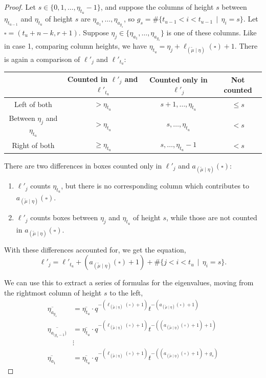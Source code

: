 \documentclass[ALCO]{cedram}
\newcommand{\mutilde}{{\widetilde{\mu}}}
\newcommand{\mutildeeta}{{(\mutilde \mid \eta)}}
\newcommand{\leg}[1]{{\ell_{#1}(\square)}}
\newcommand{\armtwo}[1]{{a_{#1}(\square)}}
\newcommand{\ltm}{\ell'_{t_u}}
\newcommand{\lj}{\ell'_j}
\begin{document}
\begin{proof}
Let $s \in \{0,1, \dotsc, \eta_{t_u}-1\}$, and suppose the columns of height $s$ between $\eta_{t_{u-1}}$ and $\eta_{t_u}$ of height $s$ are $\eta_{a_1}, \dotsc, \eta_{a_{g_s}}$, so $g_s = \# \{t_{u-1} < i < t_{u-1} \, \mid \, \eta_i = s \}$. Let $\square = (t_u+n-k,r+1)$. Suppose $\eta_j\in \{ \eta_{a_1}, \dotsc, \eta_{a_{g_s}}\}$ is one of these columns. Like in case 1, comparing column heights, we have $\eta_{t_u} = \eta_j + \leg{\mutildeeta}+1$. There is again a comparison of $\lj$ and $\ltm$: 
\begin{center}\begin{tabular}{|c|c|c|c|}
     \hline
     & Counted in $\lj$ and $\ltm$ & Counted only in $\lj$ & Not counted   \\ \hline
     Left of both& $> \eta_{t_u}$ & $s+1, \dotsc, \eta_{t_u}$ & $\leq s$ \\ \hline
     Between $\eta_j$ and $\eta_{t_u}$ & $>\eta_{t_u}$ & $s, \dotsc, \eta_{t_u}$ & $<s$\\ \hline 
     Right of both & $\geq \eta_{t_u}$ & $s, \dotsc, \eta_{t_u}-1$ & $<s$ \\ \hline 
\end{tabular}
\end{center}

There are two differences in boxes counted only in $\lj$ and $\armtwo{\mutildeeta}$:
\begin{enumerate}
    \item $\lj$ counts $\eta_{t_u}$, but there is no corresponding column which contributes to $\armtwo{\mutildeeta}$.
    \item $\lj$ counts boxes between $\eta_j$ and $\eta_{t_u}$ of height $s$, while those are not counted in $\armtwo{\mutildeeta}$.
\end{enumerate}

With these differences accounted for, we get the equation,
\[ \lj = \ltm + (\armtwo{\mutildeeta}+1) + \# \{ j < i < t_u \, \mid \, \eta_i = s\}.\]


We can use this to extract a series of formulas for the eigenvalues, moving from the rightmost column of height $s$ to the left,
\begin{align*}
    \overline{\eta_{a_{g_s}}} &= \overline{\eta_{t_u}} \cdot q^{-(\leg{\mutildeeta}+1)}t^{-(\armtwo{\mutildeeta}+1)}\\
    \overline{\eta_{a_{(g_s-1})}}&= \overline{\eta_{t_u}}\cdot q^{-(\leg{\mutildeeta}+1)}t^{-((\armtwo{\mutildeeta}+1)+1)}\\
    &\vdots \\
    \overline{\eta_{a_1}}&= \overline{\eta_{t_u}}\cdot q^{-(\leg{\mutildeeta}+1)}t^{-((\armtwo{\mutildeeta}+1)+g_s)}
\end{align*}


\end{proof}
\end{document}
